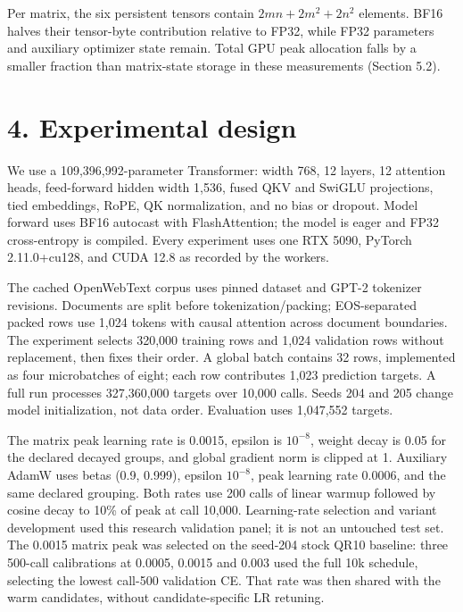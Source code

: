 \documentclass[
  10pt,
]{article}
\begin{document}
Per matrix, the six persistent tensors contain \(2mn+2m^2+2n^2\)
elements. BF16 halves their tensor-byte contribution relative to FP32,
while FP32 parameters and auxiliary optimizer state remain. Total GPU
peak allocation falls by a smaller fraction than matrix-state storage in
these measurements (Section 5.2).

\hypertarget{experimental-design}{%
\section{4. Experimental design}\label{experimental-design}}

We use a 109,396,992-parameter Transformer: width 768, 12 layers, 12
attention heads, feed-forward hidden width 1,536, fused QKV and SwiGLU
projections, tied embeddings, RoPE, QK normalization, and no bias or
dropout. Model forward uses BF16 autocast with FlashAttention; the model
is eager and FP32 cross-entropy is compiled. Every experiment uses one
RTX 5090, PyTorch 2.11.0+cu128, and CUDA 12.8 as recorded by the
workers.

The cached OpenWebText corpus uses pinned dataset and GPT-2 tokenizer
revisions. Documents are split before tokenization/packing;
EOS-separated packed rows use 1,024 tokens with causal attention across
document boundaries. The experiment selects 320,000 training rows and
1,024 validation rows without replacement, then fixes their order. A
global batch contains 32 rows, implemented as four microbatches of
eight; each row contributes 1,023 prediction targets. A full run
processes 327,360,000 targets over 10,000 calls. Seeds 204 and 205
change model initialization, not data order. Evaluation uses 1,047,552
targets.

The matrix peak learning rate is 0.0015, epsilon is \(10^{-8}\), weight
decay is 0.05 for the declared decayed groups, and global gradient norm
is clipped at 1. Auxiliary AdamW uses betas (0.9, 0.999), epsilon
\(10^{-8}\), peak learning rate 0.0006, and the same declared grouping.
Both rates use 200 calls of linear warmup followed by cosine decay to
10\% of peak at call 10,000. Learning-rate selection and variant
development used this research validation panel; it is not an untouched
test set. The 0.0015 matrix peak was selected on the seed-204 stock QR10
baseline: three 500-call calibrations at 0.0005, 0.0015 and 0.003 used
the full 10k schedule, selecting the lowest call-500 validation CE. That
rate was then shared with the warm candidates, without
candidate-specific LR retuning.
\end{document}
